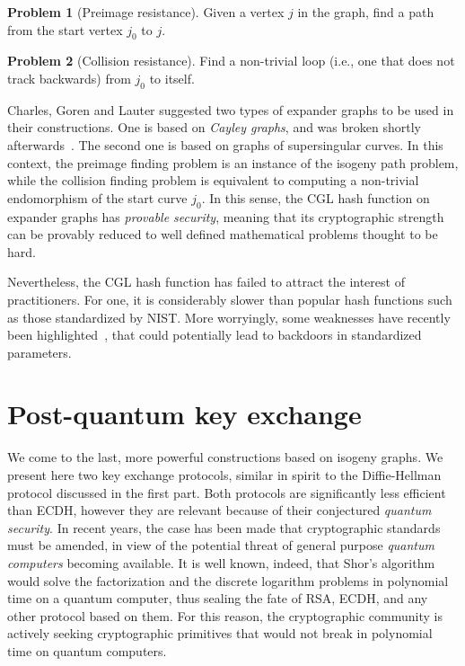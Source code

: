 \documentclass[10pt]{article}
\theoremstyle{plain}
\theoremstyle{definition}
\newtheorem{problem}{Problem}
\begin{document}
\begin{problem}[Preimage resistance]
  Given a vertex $j$ in the graph, find a path from the start vertex
  $j_0$ to $j$.
\end{problem}

\begin{problem}[Collision resistance]
  Find a non-trivial loop (i.e., one that does not track backwards)
  from $j_0$ to itself.
\end{problem}

Charles, Goren and Lauter suggested two types of expander graphs to be
used in their constructions. %
One is based on \emph{Cayley graphs}, and was broken shortly
afterwards~\cite{tillich2008collisions,quis}. %
The second one is based on graphs of supersingular curves. %
In this context, the preimage finding problem is an instance of the
isogeny path problem, while the collision finding problem is
equivalent to computing a non-trivial endomorphism of the start curve
$j_0$. %
In this sense, the CGL hash function on expander graphs has
\emph{provable security}, meaning that its cryptographic strength can
be provably reduced to well defined mathematical problems thought to
be hard.

Nevertheless, the CGL hash function has failed to attract the interest
of practitioners. %
For one, it is considerably slower than popular hash functions such as
those standardized by NIST. %
More worryingly, some weaknesses have recently been
highlighted~\cite{kohel2014quaternion,cryptoeprint:2017:962}, that
could potentially lead to backdoors in standardized parameters.


\section{Post-quantum key exchange}
\label{sec:post-quantum-key}

We come to the last, more powerful constructions based on isogeny
graphs. %
We present here two key exchange protocols, similar in spirit to the
Diffie-Hellman protocol discussed in the first part. %
Both protocols are significantly less efficient than ECDH, however
they are relevant because of their conjectured \emph{quantum
  security}. %
In recent years, the case has been made that cryptographic standards
must be amended, in view of the potential threat of general purpose
\emph{quantum computers} becoming available. %
It is well known, indeed, that Shor's
algorithm~\cite{shor1994algorithms} would solve the factorization and
the discrete logarithm problems in polynomial time on a quantum
computer, thus sealing the fate of RSA, ECDH, and any other protocol
based on them. %
For this reason, the cryptographic community is actively seeking
cryptographic primitives that would not break in polynomial time on
quantum computers.
\end{document}
